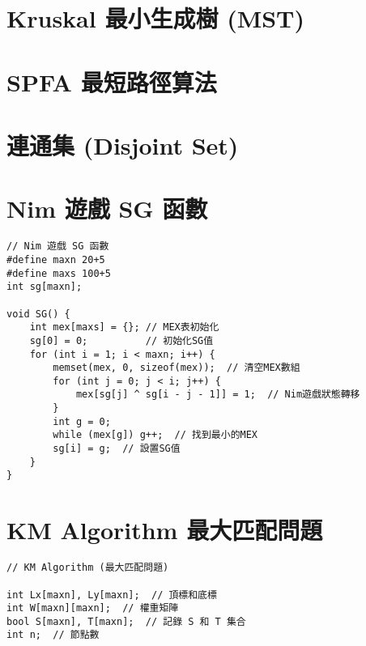 \documentclass{article}
\begin{document}
\begin{multicols}{2}


\section{Kruskal 最小生成樹 (MST)}



\section{SPFA 最短路徑算法}



\section{連通集 (Disjoint Set)}



\section{Nim 遊戲 SG 函數}

\begin{lstlisting}
// Nim 遊戲 SG 函數
#define maxn 20+5
#define maxs 100+5
int sg[maxn];

void SG() {
    int mex[maxs] = {}; // MEX表初始化
    sg[0] = 0;          // 初始化SG值
    for (int i = 1; i < maxn; i++) {
        memset(mex, 0, sizeof(mex));  // 清空MEX數組
        for (int j = 0; j < i; j++) {
            mex[sg[j] ^ sg[i - j - 1]] = 1;  // Nim遊戲狀態轉移
        }
        int g = 0;
        while (mex[g]) g++;  // 找到最小的MEX
        sg[i] = g;  // 設置SG值
    }
}
\end{lstlisting}

\section{KM Algorithm 最大匹配問題}

\begin{lstlisting}
// KM Algorithm (最大匹配問題)

int Lx[maxn], Ly[maxn];  // 頂標和底標
int W[maxn][maxn];  // 權重矩陣
bool S[maxn], T[maxn];  // 記錄 S 和 T 集合
int n;  // 節點數


\end{lstlisting}
\end{multicols}
\end{document}
